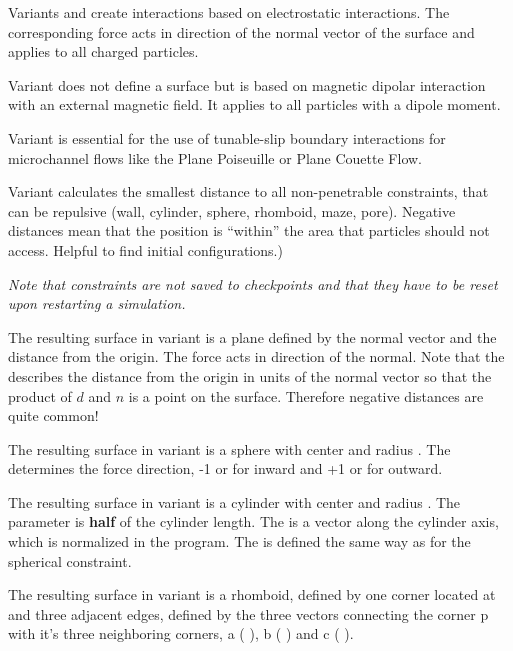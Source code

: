 Variants  and  create interactions based on electrostatic
interactions. The corresponding force acts in direction of the normal vector of the
surface and applies to all charged particles.

Variant  does not define a surface but is based on magnetic
dipolar interaction with an external magnetic field. It applies to all particles
with a dipole moment.

Variant  is essential for the use of tunable-slip boundary
interactions for microchannel flows like the Plane Poiseuille or Plane Couette
Flow.

Variant  calculates the smallest distance to all non-penetrable
constraints, that can be repulsive (wall, cylinder, sphere, rhomboid, maze, pore).
Negative distances mean that the position is ``within'' the area that
particles should not access. Helpful to find initial configurations.) 

\emph{Note that constraints are not saved to checkpoints and that they have to
be reset upon restarting a simulation.}

The resulting surface in variant  is a plane defined by the
normal vector    and the distance
 from the origin. The force acts in direction of the normal. 
Note that the  describes the distance from the origin in units
of the normal vector so that the product of $d$ and $n$ is a point on the
surface. Therefore negative distances are quite common!

The resulting surface in variant
 is a sphere with center    and radius
. The  determines the force direction, -1 or
 for inward and +1 or  for outward. 

The resulting surface
in variant  is a cylinder with center  
 and radius . The  parameter is \textbf{half} 
of the cylinder length. The  is a
vector along the cylinder axis, which is normalized in the program.
The  is defined the same way as for the spherical
constraint. 

The resulting surface in variant  is a rhomboid, defined by one 
corner located at    and three adjacent edges, 
defined by the three vectors connecting the corner p with it's three neighboring
corners, a (  ), b (  ) 
and c (  ).


